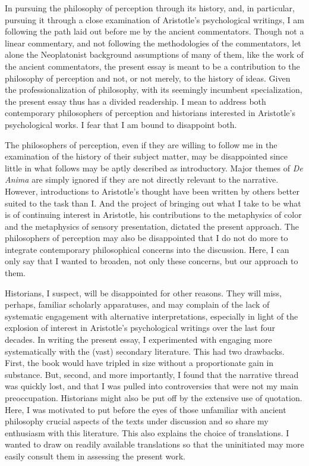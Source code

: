 In pursuing the philosophy of perception through its history, and, in particular, pursuing it through a close examination of Aristotle's psychological writings, I am following the path laid out before me by the ancient commentators. Though not a linear commentary, and not following the methodologies of the commentators, let alone the Neoplatonist background assumptions of many of them, like the work of the ancient commentators, the present essay is meant to be a contribution to the philosophy of perception and not, or not merely, to the history of ideas. Given the professionalization of philosophy, with its seemingly incumbent specialization, the present essay thus has a divided readership. I mean to address both contemporary philosophers of perception and historians interested in Aristotle's psychological works. I fear that I am bound to disappoint both. 

The philosophers of perception, even if they are willing to follow me in the examination of the history of their subject matter, may be disappointed since little in what follows may be aptly described as introductory. Major themes of \emph{De Anima} are simply ignored if they are not directly relevant to the narrative. However, introductions to Aristotle's thought have been written by others better suited to the task than I. And the project of bringing out what I take to be what is of continuing interest in Aristotle, his contributions to the metaphysics of color and the metaphysics of sensory presentation, dictated the present approach. The philosophers of perception may also be disappointed that I do not do more to integrate contemporary philosophical concerns into the discussion. Here, I can only say that I wanted to broaden, not only these concerns, but our approach to them.

Historians, I suspect, will be disappointed for other reasons. They will miss, perhaps, familiar scholarly apparatuses, and may complain of the lack of systematic engagement with alternative interpretations, especially in light of the explosion of interest in Aristotle's psychological writings over the last four decades. In writing the present essay, I experimented with engaging more systematically with the (vast) secondary literature. This had two drawbacks. First, the book would have tripled in size without a proportionate gain in substance. But, second, and more importantly, I found that the narrative thread was quickly lost, and that I was pulled into controversies that were not my main preoccupation. Historians might also be put off by the extensive use of quotation. Here, I was motivated to put before the eyes of those unfamiliar with ancient philosophy crucial aspects of the texts under discussion and so share my enthusiasm with this literature. This also explains the choice of translations. I wanted to draw on readily available translations so that the uninitiated may more easily consult them in assessing the present work.

